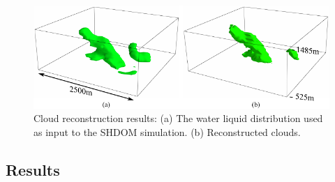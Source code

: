 \documentclass[runningheads]{llncs}
\begin{document}
\begin{figure}
  \begin{center}
    \includegraphics{figures/clouds3d_SHDOM}
    \caption{Cloud reconstruction results: (a) The water liquid
      distribution used as input to the SHDOM simulation. (b)
      Reconstructed clouds.}
    \label{fig:simulation_imgs2}
  \end{center}
\end{figure}

\subsection{Results}
\end{document}
